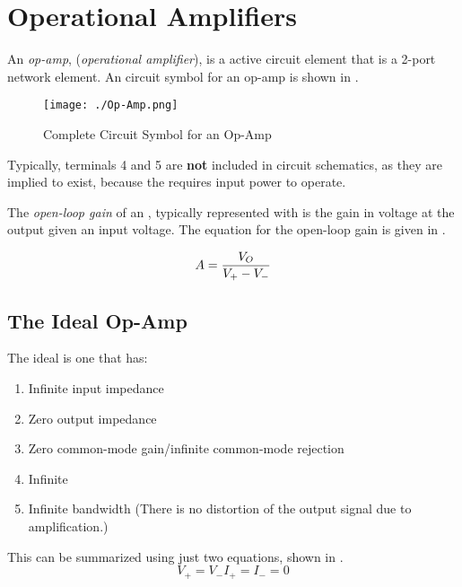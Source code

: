 \section{Operational Amplifiers}\label{sec:Op-Amps}
\begin{definition}[Op-Amp]\label{def:Op-Amp}
  An \emph{op-amp}, (\emph{operational amplifier}), is a active circuit element that is a 2-port network element.
  An circuit symbol for an op-amp is shown in .
\end{definition}

\begin{figure}[h!tbp]
  \centering
  \texttt{[image: ./Op-Amp.png]}
  \caption{Complete Circuit Symbol for an Op-Amp \parencite[p.~60]{sedraTextbook7}}
  \label{fig:Op-Amp}
\end{figure}

Typically, terminals 4 and 5 are \textbf{not} included in circuit schematics, as they are implied to exist, because the  requires input power to operate.

\begin{definition}\label{def:Open-Loop_Gain}
  The \emph{open-loop gain} of an , typically represented with \OpenLoopGain{} is the gain in voltage at the output given an input voltage.
  The equation for the open-loop gain is given in .

  \begin{equation}\label{eq:Open-Loop_Gain}
    A = \frac{V_{O}}{V_{+} - V_{-}}
  \end{equation}
\end{definition}

\subsection{The Ideal Op-Amp}\label{subsec:Ideal_Op-Amp}
The ideal  is one that has:
\begin{enumerate}[noitemsep]
\item Infinite input impedance
\item Zero output impedance
\item Zero common-mode gain/infinite common-mode rejection
\item Infinite 
\item Infinite bandwidth (There is no distortion of the output signal due to amplification.)
\end{enumerate}

This can be summarized using just two equations, shown in .
\begin{subequations}
  \begin{equation}\label{eq:Ideal_Op-Amp-Voltage}
    V_{+} = V_{-}
  \end{equation}
  \begin{equation}\label{eq:Ideal_Op-Amp-Current}
    I_{+} = I_{-} = 0
  \end{equation}
\end{subequations}



